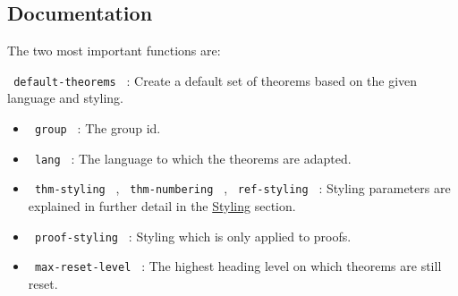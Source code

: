 \begin{Shaded}
\begin{Highlighting}[]

\NormalTok{)}

\NormalTok{)}


\NormalTok{\#theorem[}
\NormalTok{]}
\NormalTok{\#theorem(name: "Some theorem")[}
\NormalTok{]}
\end{Highlighting}
\end{Shaded}


\subsection{Documentation}\label{documentation}

The two most important functions are:

\texttt{\ default-theorems\ } : Create a default set of theorems based
on the given language and styling.

\begin{itemize}
\tightlist
\item
  \texttt{\ group\ } : The group id.
\item
  \texttt{\ lang\ } : The language to which the theorems are adapted.
\item
  \texttt{\ thm-styling\ } , \texttt{\ thm-numbering\ } ,
  \texttt{\ ref-styling\ } : Styling parameters are explained in further
  detail in the
  \href{https://github.com/typst/packages/raw/main/packages/preview/lemmify/0.1.6/\#styling-parameters}{Styling}
  section.
\item
  \texttt{\ proof-styling\ } : Styling which is only applied to proofs.
\item
  \texttt{\ max-reset-level\ } : The highest heading level on which
  theorems are still reset.
\end{itemize}

